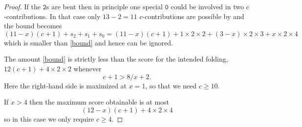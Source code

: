\documentclass[10pt,a4paper]{amsart}
\newcommand{\mt}{\mathtt}
\begin{document}
\begin{proof}
	If the $\mt 2$s are bent then
	in principle one special $\mt 0$ could be involved in two $c$-contributions.
	In that case only $13-2=11$ $c$-contributions are possible by  and the bound becomes
	\[
			(11-x)(c+1) + s_2 + s_1 + s_0 = (11-x)(c+1) + 1\times 2\times 2  + (3-x)\times 2\times 3 + x \times 2 \times 4
	\]
	which is smaller than \eqref{bound} and hence can be ignored.


	The amount \eqref{bound} is strictly less than the score for the intended folding,
	\(
		12(c+1) + 4\times 2\times 2
	\)
	whenever
	\[
		c+1 > 8/x +2.
	\]
	Here the right-hand side is maximized at $x=1$, so that we need $c \ge 10$.

	If $x>4$ then the maximum score obtainable is at most
	\[
		(12-x)(c+1) + 4 \times 2 \times 4
	\]
	so in this case we only require $c\ge 4$.
\end{proof}
\end{document}
